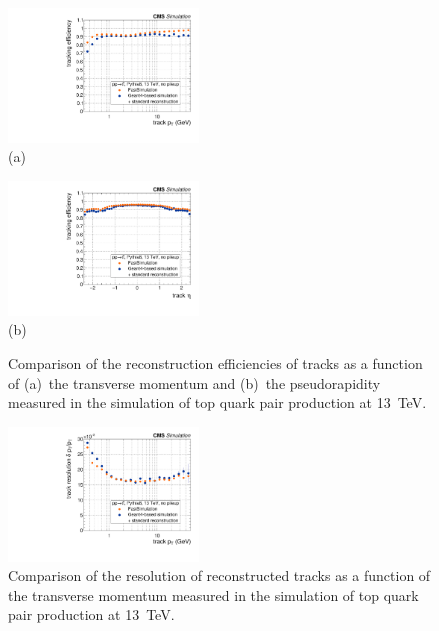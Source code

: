 \documentclass[a4paper]{jpconf}
\begin{document}
\begin{figure}[htbp]
\begin{center}
\parbox{0.46\textwidth}{\centering\includegraphics[width=0.45\textwidth]{figures/eff_pt.pdf}\\(a)}
\hspace{0.05\textwidth}
\parbox{0.46\textwidth}{\centering\includegraphics[width=0.45\textwidth]{figures/eff_eta.pdf}\\(b)}
\caption{\label{fig:eff-tracks}Comparison of the reconstruction efficiencies of tracks as a function of (a)~the transverse momentum and (b)~the pseudorapidity measured in the simulation of top quark pair production at 13~TeV.}
\end{center}
\end{figure}

\begin{figure}[htbp]
\begin{center}
\includegraphics[width=0.45\textwidth]{figures/res_pt.pdf}
\caption{\label{fig:res-track}Comparison of the resolution of reconstructed tracks as a function of the transverse momentum measured in the simulation of top quark pair production at 13~TeV.}
\end{center}
\end{figure}
\end{document}
